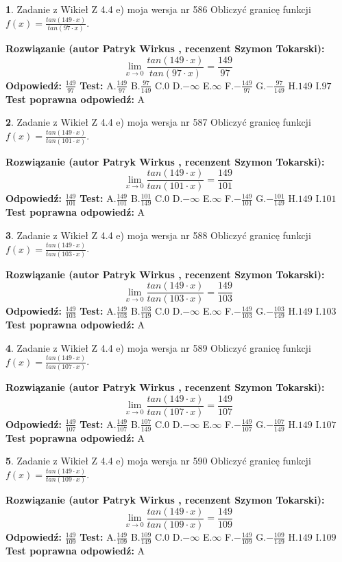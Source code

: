 \documentclass[12pt, a4paper]{article}
\theoremstyle{definition} %
\newtheorem{zad}{}
\newcommand{\zadStart}[1]{\begin{zad}#1\newline}
\newcommand{\zadStop}{\end{zad}}
\newcommand{\rozwStart}[2]{\noindent \textbf{Rozwiązanie (autor #1 , recenzent #2): }\newline}
\newcommand{\rozwStop}{\newline}
\newcommand{\odpStart}{\noindent \textbf{Odpowiedź:}\newline}
\newcommand{\odpStop}{\newline}
\newcommand{\testStart}{\noindent \textbf{Test:}\newline}
\newcommand{\testStop}{\newline}
\newcommand{\kluczStart}{\noindent \textbf{Test poprawna odpowiedź:}\newline}
\newcommand{\kluczStop}{\newline}
\begin{document}
\zadStart{Zadanie z Wikieł Z 4.4 e) moja wersja nr 586}
Obliczyć granicę funkcji $f(x)=\frac{tan(149\cdot x)}{tan(97\cdot x)}$.
\zadStop
\rozwStart{Patryk Wirkus}{Szymon Tokarski}
$$\lim\limits_{x\to 0}\frac{tan(149\cdot x)}{tan(97\cdot x)}=
\frac{149}{97}$$
\rozwStop
\odpStart
$\frac{149}{97}$
\odpStop
\testStart
A.$\frac{149}{97}$
B.$\frac{97}{149}$
C.$0$
D.$-\infty$
E.$\infty$
F.$-\frac{149}{97}$
G.$-\frac{97}{149}$
H.$149$
I.$97$
\testStop
\kluczStart
A
\kluczStop



\zadStart{Zadanie z Wikieł Z 4.4 e) moja wersja nr 587}
Obliczyć granicę funkcji $f(x)=\frac{tan(149\cdot x)}{tan(101\cdot x)}$.
\zadStop
\rozwStart{Patryk Wirkus}{Szymon Tokarski}
$$\lim\limits_{x\to 0}\frac{tan(149\cdot x)}{tan(101\cdot x)}=
\frac{149}{101}$$
\rozwStop
\odpStart
$\frac{149}{101}$
\odpStop
\testStart
A.$\frac{149}{101}$
B.$\frac{101}{149}$
C.$0$
D.$-\infty$
E.$\infty$
F.$-\frac{149}{101}$
G.$-\frac{101}{149}$
H.$149$
I.$101$
\testStop
\kluczStart
A
\kluczStop



\zadStart{Zadanie z Wikieł Z 4.4 e) moja wersja nr 588}
Obliczyć granicę funkcji $f(x)=\frac{tan(149\cdot x)}{tan(103\cdot x)}$.
\zadStop
\rozwStart{Patryk Wirkus}{Szymon Tokarski}
$$\lim\limits_{x\to 0}\frac{tan(149\cdot x)}{tan(103\cdot x)}=
\frac{149}{103}$$
\rozwStop
\odpStart
$\frac{149}{103}$
\odpStop
\testStart
A.$\frac{149}{103}$
B.$\frac{103}{149}$
C.$0$
D.$-\infty$
E.$\infty$
F.$-\frac{149}{103}$
G.$-\frac{103}{149}$
H.$149$
I.$103$
\testStop
\kluczStart
A
\kluczStop



\zadStart{Zadanie z Wikieł Z 4.4 e) moja wersja nr 589}
Obliczyć granicę funkcji $f(x)=\frac{tan(149\cdot x)}{tan(107\cdot x)}$.
\zadStop
\rozwStart{Patryk Wirkus}{Szymon Tokarski}
$$\lim\limits_{x\to 0}\frac{tan(149\cdot x)}{tan(107\cdot x)}=
\frac{149}{107}$$
\rozwStop
\odpStart
$\frac{149}{107}$
\odpStop
\testStart
A.$\frac{149}{107}$
B.$\frac{107}{149}$
C.$0$
D.$-\infty$
E.$\infty$
F.$-\frac{149}{107}$
G.$-\frac{107}{149}$
H.$149$
I.$107$
\testStop
\kluczStart
A
\kluczStop



\zadStart{Zadanie z Wikieł Z 4.4 e) moja wersja nr 590}
Obliczyć granicę funkcji $f(x)=\frac{tan(149\cdot x)}{tan(109\cdot x)}$.
\zadStop
\rozwStart{Patryk Wirkus}{Szymon Tokarski}
$$\lim\limits_{x\to 0}\frac{tan(149\cdot x)}{tan(109\cdot x)}=
\frac{149}{109}$$
\rozwStop
\odpStart
$\frac{149}{109}$
\odpStop
\testStart
A.$\frac{149}{109}$
B.$\frac{109}{149}$
C.$0$
D.$-\infty$
E.$\infty$
F.$-\frac{149}{109}$
G.$-\frac{109}{149}$
H.$149$
I.$109$
\testStop
\kluczStart
A
\kluczStop
\end{document}
